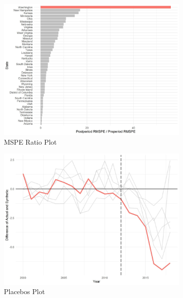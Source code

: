 \documentclass{article}
\begin{document}


\begin{figure}[H]
	\begin{center}
		\includegraphics[width=0.85\textwidth]{mspe_plot_washington}
	\end{center}
	\caption{MSPE Ratio Plot}
	\label{fig:mspe_plot_washington}
\end{figure}

\begin{figure}[H]
	\begin{center}
		\includegraphics[width=0.85\textwidth]{placebos_plot_washington}
	\end{center}
	\caption{Placebos Plot}
	\label{fig:placebos_plot_washington}
\end{figure}
\end{document}
